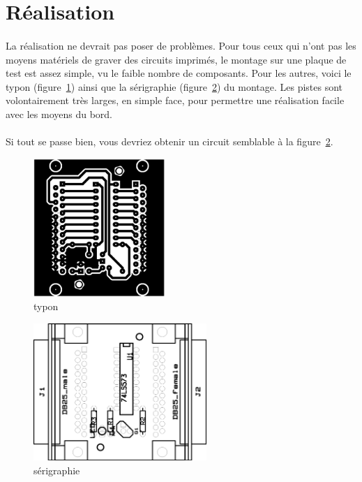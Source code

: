 \documentclass[11pt,a4paper]{book}
\begin{document}
\section{R\'ealisation}

\paragraph*{}
La r\'ealisation ne devrait pas poser de probl\`emes. Pour tous ceux qui n'ont pas les moyens
mat\'eriels de graver des circuits imprim\'es, le montage sur une plaque de test est assez
simple, vu le faible nombre de composants. Pour les autres, voici le typon (figure~\ref{latch2}) 
ainsi que la s\'erigraphie (figure~\ref{latch3}) du montage. Les pistes sont volontairement
tr\`es larges, en simple face, pour permettre une r\'ealisation facile avec les moyens du bord.

\paragraph*{}
Si tout se passe bien, vous devriez obtenir un circuit semblable \`a la figure~\ref{latch3}.

\begin{figure}
 \center
 \includegraphics[width=5cm]{./medias/latch2.png}
 \caption{typon}
 \label{latch2}
 \end{figure}
 
 \begin{figure}
 \center
 \includegraphics[height=52mm]{./medias/latch3.png}
 \caption{s\'erigraphie}
 \label{latch3}
 \end{figure}
 
\end{document}
